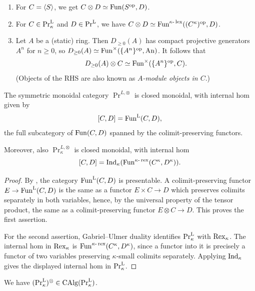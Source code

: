 \documentclass[11pt]{book}
\begin{document}
	\begin{example}
		\begin{enumerate}
			\item For $C = \langle S \rangle$, we get $C \otimes D \simeq \operatorname{Fun}(S^{\textup{op}},D)$.
			\item For $C \in \textup{Pr}^{\textup{L}}_{\kappa}$ and $D \in \textup{Pr}^{\textup{L}}$, we have $C \otimes D \simeq \operatorname{Fun}^{\kappa\text{-}\operatorname{lex}}((C^{\kappa})^{\textup{op}},D)$.
			\item Let $A$ be a (static) ring. Then $D_{\geq 0}(A)$ has compact projective generators $A^n$ for $n \geq 0$, so $D_{\geq 0}(A) \simeq \operatorname{Fun}^{\times}(\{A^n\}^{\textup{op}},{\textup{An}})$. It follows that
			\[
				D_{\geq 0}(A) \otimes C \simeq \operatorname{Fun}^{\times}(\{A^n\}^{\textup{op}},C).
			\]
			(Objects of the RHS are also known as \emph{$A$-module objects in $C$}.)
		\end{enumerate}
	\end{example}

	\begin{proposition}
		The symmetric monoidal category $\Pr^{L,\otimes}$ is closed monoidal, with internal hom given by
		\[
			[C,D] = \operatorname{Fun}^{\textup{L}}(C,D),
		\]
		the full subcategory of $\operatorname{Fun}(C,D)$ spanned by the colimit-preserving functors.

		Moreover, also $\Pr^{L,\otimes}_{\kappa}$ is closed monoidal, with internal hom
		\[
			[C,D] = \operatorname{Ind}_{\kappa}(\operatorname{Fun}^{\kappa\text{-}\operatorname{rex}}(C^{\kappa},D^{\kappa})).
		\]
	\end{proposition}

	\begin{proof}
		By \cite[Proposition 5.5.3.8]{lurie2009HTT}, the category $\operatorname{Fun}^{\textup{L}}(C,D)$ is presentable. A colimit-preserving functor $E \to \operatorname{Fun}^{\textup{L}}(C,D)$ is the same as a functor $E \times C \to D$ which preserves colimits separately in both variables, hence, by the universal property of the tensor product, the same as a colimit-preserving functor $E \otimes C \to D$. This proves the first assertion.

		For the second assertion, Gabriel--Ulmer duality identifies $\textup{Pr}^{\textup{L}}_{\kappa}$ with $\operatorname{Rex}_{\kappa}$. The internal hom in $\operatorname{Rex}_{\kappa}$ is $\operatorname{Fun}^{\kappa\text{-}\operatorname{rex}}(C^{\kappa},D^{\kappa})$, since a functor into it is precisely a functor of two variables preserving $\kappa$-small colimits separately. Applying $\operatorname{Ind}_{\kappa}$ gives the displayed internal hom in $\textup{Pr}^{\textup{L}}_{\kappa}$.
	\end{proof}

	\begin{proposition}
		We have $(\textup{Pr}^{\textup{L}}_{\kappa})^{\otimes} \in {\textup{CAlg}}(\textup{Pr}^{\textup{L}}_{\kappa})$.
	\end{proposition}
\end{document}
